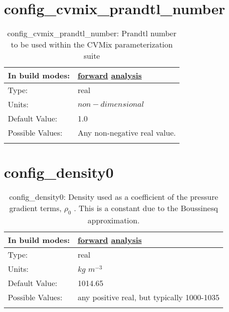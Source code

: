 \section[config\_cvmix\_prandtl\_number]{config\_cvmix\_prandtl\_number}
\label{sec:nm_sec_config_cvmix_prandtl_number}
\begin{center}
\begin{longtable}{| p{2.0in} || p{4.0in} |}
    \hline
    In build modes: & \hyperref[subsec:forward_nm_tab_cvmix]{forward} \hyperref[subsec:analysis_nm_tab_cvmix]{analysis} \\
    \hline
    Type: & real \\
    \hline
    Units: & $non-dimensional$ \\
    \hline
    Default Value: & 1.0 \\
    \hline
    Possible Values: & Any non-negative real value. \\
    \hline
    \caption{config\_cvmix\_prandtl\_number: Prandtl number to be used within the CVMix parameterization suite}
\end{longtable}
\end{center}
\section[config\_density0]{config\_density0}
\label{sec:nm_sec_config_density0}
\begin{center}
\begin{longtable}{| p{2.0in} || p{4.0in} |}
    \hline
    In build modes: & \hyperref[subsec:forward_nm_tab_pressure_gradient]{forward} \hyperref[subsec:analysis_nm_tab_pressure_gradient]{analysis} \\
    \hline
    Type: & real \\
    \hline
    Units: & $kg$ $m^{-3}$ \\
    \hline
    Default Value: & 1014.65 \\
    \hline
    Possible Values: & any positive real, but typically 1000-1035 \\
    \hline
    \caption{config\_density0:  Density used as a coefficient of the pressure gradient terms,  $\rho_0$ .  This is a constant due to the Boussinesq approximation.}
\end{longtable}
\end{center}
